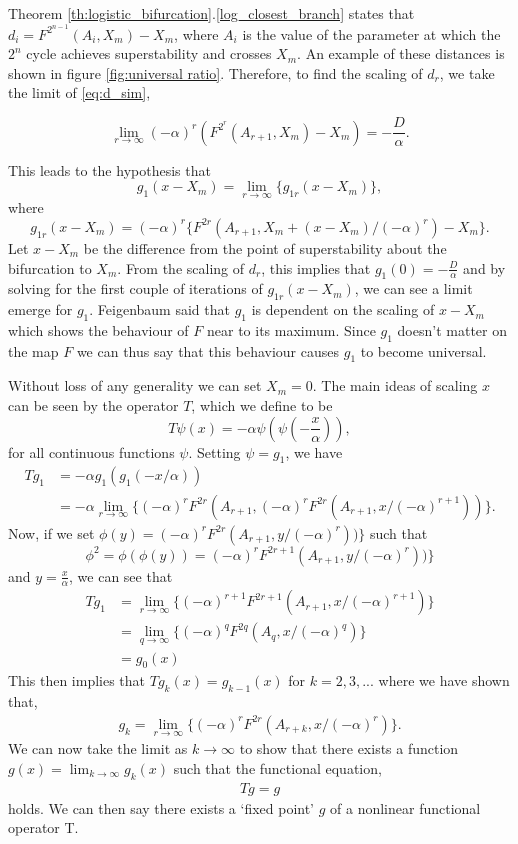 Theorem \ref{th:logistic_bifurcation}.\ref{log_closest_branch} states that $d_i = F^{2^{n-1}}(A_i, X_m) - X_m$, where $A_i$ is the value of the parameter at which the $2^n$ cycle achieves superstability and crosses $X_m$. An example of these distances is shown in figure \ref{fig:universal ratio}.
Therefore, to find the scaling of $d_r$, we take the limit of \eqref{eq:d_sim},

\begin{equation}
\lim_{r \to \infty} (-\alpha)^r \left(F^{2^r}(A_{r+1}, X_m) - X_m\right) = - \frac{D}{\alpha}.
\end{equation}

This leads to the hypothesis that
$$
g_1(x-X_m)=\lim_{r \to \infty} \{g_{1r}(x-X_m)\},
$$
where
$$
g_{1r}(x-X_m) = (-\alpha)^r \{F^{2r}(A_{r+1}, X_m + (x-X_m)/(-\alpha)^r)-X_m\}.
$$
Let $x-X_m$ be the difference from the point of superstability about the bifurcation to $X_m$. 
From the scaling of $d_r$, this implies that $g_1(0)=-\frac{D}{\alpha}$ and by solving for the first couple of iterations of $g_{1r}(x-X_m)$, we can see a limit emerge for $g_1$.
Feigenbaum said that $g_1$ is dependent on the scaling of $x-X_m$ which shows the behaviour of $F$ near to its maximum. 
Since $g_1$ doesn't matter on the map $F$ we can thus say that this behaviour causes $g_1$ to become universal.

Without loss of any generality we can set $X_m=0$.
The main ideas of scaling $x$ can be seen by the operator $T$, which we define to be
\begin{equation} \label{eq: operator T}
T\psi(x)=-\alpha \psi (\psi(-\frac{x}{\alpha})),
\end{equation}
for all continuous functions $\psi$.
Setting $\psi=g_1$, we have
\begin{align}
    Tg_1 &=-\alpha g_1(g_1(-x/\alpha)) \nonumber \\
    &= -\alpha \lim_{r \to \infty} \{(-\alpha)^rF^{2r}(A_{r+1}, (-\alpha)^rF^{2r}(A_{r+1},x/(-\alpha)^{r+1}))\}.  \label{eq:one}
\end{align}
Now, if we set $\phi(y)=(-\alpha)^rF^{2r}(A_{r+1},y/(-\alpha)^r))\}$ such that $$\phi^2=\phi(\phi(y))=(-\alpha)^rF^{2r+1}(A_{r+1},y/(-\alpha)^r))\}$$ and $y=\frac{x}{\alpha}$, we can see that
\begin{align*}
    Tg_1 &= \lim_{r \to \infty} \{(-\alpha)^{r+1}F^{2r+1}(A_{r+1}, x/(-\alpha)^{r+1})\} \\
    &= \lim_{q \to \infty} \{(-\alpha)^qF^{2q}(A_q,x/(-\alpha)^q)\} \\
    &= g_0(x)
\end{align*}
This then implies that $Tg_k(x)=g_{k-1}(x)$ for $k = 2,3,...$ where we have shown that,
\begin{align}
    g_k=\lim_{r \to \infty} \{(-\alpha)^{r}F^{2r}(A_{r+k}, x/(-\alpha)^{r})\}. \label{eq:two}
\end{align} 
We can now take the limit as $k \to \infty$ to show that there exists a function $g(x)= \lim_{k \to \infty}g_k(x)$ such that  the functional equation,
\begin{align}
    Tg=g \label{eq:FunctionalOperator}
\end{align}
holds. We can then say there exists a `fixed point' $g$ of a nonlinear functional operator T.

